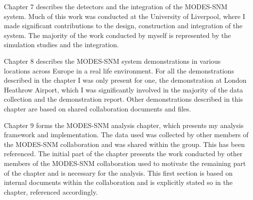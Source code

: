 \begin{declaration}
Chapter 7 describes the detectors and the integration of the MODES-SNM system. Much of this work was conducted at the University of Liverpool, where I made significant contributions to the design, construction and integration of the system. The majority of the work conducted by myself is represented by the simulation studies and the integration.

Chapter 8 describes the MODES-SNM system demonstrations in various locations across Europe in a real life environment. For all the demonstrations described in the chapter I was only present for one, the demonstration at London Heathrow Airport, which I was significantly involved in the majority of the data collection and the demonstration report. Other demonstrations described in this chapter are based on shared collaboration documents and files. 

Chapter 9 forms the MODES-SNM analysis chapter, which presents my analysis framework and implementation. The data used was collected by other members of the MODES-SNM collaboration and was shared within the group. This has been referenced. The initial part of the chapter presents the work conducted by other members of the MODES-SNM collaboration used to motivate the remaining part of the chapter and is necessary for the analysis. This first section is based on internal documents within the collaboration and is explicitly stated so in the chapter, referenced accordingly.

\end{declaration}


